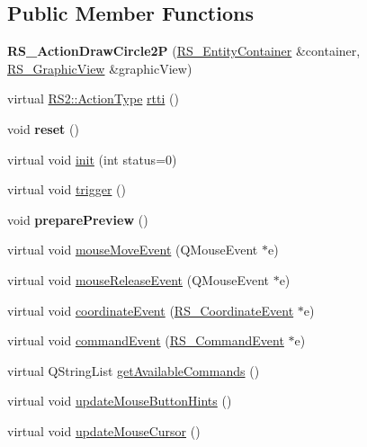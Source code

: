 \subsection*{Public Member Functions}
\begin{DoxyCompactItemize}
\item 
\hypertarget{classRS__ActionDrawCircle2P_a38be63d1f866ad239bc46fdc6bea6a78}{{\bfseries R\-S\-\_\-\-Action\-Draw\-Circle2\-P} (\hyperlink{classRS__EntityContainer}{R\-S\-\_\-\-Entity\-Container} \&container, \hyperlink{classRS__GraphicView}{R\-S\-\_\-\-Graphic\-View} \&graphic\-View)}\label{classRS__ActionDrawCircle2P_a38be63d1f866ad239bc46fdc6bea6a78}

\item 
virtual \hyperlink{classRS2_afe3523e0bc41fd637b892321cfc4b9d7}{R\-S2\-::\-Action\-Type} \hyperlink{classRS__ActionDrawCircle2P_a9e4e2223c7aa8b8d6c2c48e3fde35147}{rtti} ()
\item 
\hypertarget{classRS__ActionDrawCircle2P_acbce06319ebc659002df6b902a767d7a}{void {\bfseries reset} ()}\label{classRS__ActionDrawCircle2P_acbce06319ebc659002df6b902a767d7a}

\item 
virtual void \hyperlink{classRS__ActionDrawCircle2P_abcf760094d8d463ea6c5a18472c91450}{init} (int status=0)
\item 
virtual void \hyperlink{classRS__ActionDrawCircle2P_a35eac4823382124844f2de816ce30af5}{trigger} ()
\item 
\hypertarget{classRS__ActionDrawCircle2P_a936d88f411b4abb5036e0e28910623e3}{void {\bfseries prepare\-Preview} ()}\label{classRS__ActionDrawCircle2P_a936d88f411b4abb5036e0e28910623e3}

\item 
virtual void \hyperlink{classRS__ActionDrawCircle2P_a154d92e577b9e6a77f16ce8e1d369dde}{mouse\-Move\-Event} (Q\-Mouse\-Event $\ast$e)
\item 
virtual void \hyperlink{classRS__ActionDrawCircle2P_a67d4b88e1988322383b68a31d10efec3}{mouse\-Release\-Event} (Q\-Mouse\-Event $\ast$e)
\item 
virtual void \hyperlink{classRS__ActionDrawCircle2P_a862f8ed7e984559c6eedba332d4e2474}{coordinate\-Event} (\hyperlink{classRS__CoordinateEvent}{R\-S\-\_\-\-Coordinate\-Event} $\ast$e)
\item 
virtual void \hyperlink{classRS__ActionDrawCircle2P_a13f9669929066720728f7435b247d1fc}{command\-Event} (\hyperlink{classRS__CommandEvent}{R\-S\-\_\-\-Command\-Event} $\ast$e)
\item 
virtual Q\-String\-List \hyperlink{classRS__ActionDrawCircle2P_a025e1e38f38060c827202c14684c3885}{get\-Available\-Commands} ()
\item 
virtual void \hyperlink{classRS__ActionDrawCircle2P_a458ce0183a1c304da0f8a2dd8d979dc0}{update\-Mouse\-Button\-Hints} ()
\item 
virtual void \hyperlink{classRS__ActionDrawCircle2P_a32e3065ce5d2f9346708926fbe4d61e1}{update\-Mouse\-Cursor} ()
\end{DoxyCompactItemize}
